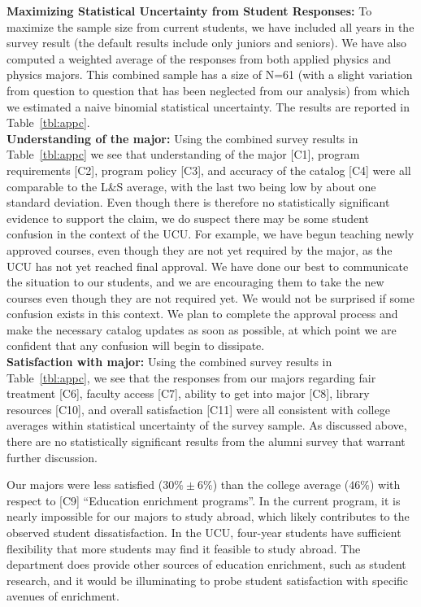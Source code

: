 \documentclass[12pt]{article}
\begin{document}
\noindent
{\bf Maximizing Statistical Uncertainty from Student Responses:} To
maximize the sample size from current students, we have included all
years in the survey result (the default results include only juniors
and seniors).  We have also computed a weighted average of the
responses from both applied physics and physics majors.  This combined
sample has a size of N=61 (with a slight variation from question to
question that has been neglected from our analysis) from which we
estimated a naive binomial statistical uncertainty.  The results are
reported in Table~\ref{tbl:appc}.\\[3pt]

\noindent
{\bf Understanding of the major:} Using the combined survey results in
Table~\ref{tbl:appc} we see that understanding of the major [C1],
program requirements [C2], program policy [C3], and accuracy of the
catalog [C4] were all comparable to the L\&S average, with the last
two being low by about one standard deviation.  Even though there is
therefore no statistically significant evidence to support the claim,
we do suspect there may be some student confusion in the context of
the UCU.  For example, we have begun teaching newly approved courses,
even though they are not yet required by the major, as the UCU has not
yet reached final approval.  We have done our best to communicate the
situation to our students, and we are encouraging them to take the new
courses even though they are not required yet.  We would not be
surprised if some confusion exists in this context.  We plan to
complete the approval process and make the necessary catalog updates
as soon as possible, at which point we are confident that any
confusion will begin to dissipate.\\[3pt]

\noindent
{\bf Satisfaction with major:} Using the combined survey results in
Table~\ref{tbl:appc}, we see that the responses from our majors
regarding fair treatment [C6], faculty access [C7], ability to get
into major [C8], library resources [C10], and overall satisfaction
[C11] were all consistent with college averages within statistical
uncertainty of the survey sample.  As discussed above, there are no
statistically significant results from the alumni survey that warrant
further discussion.

Our majors were less satisfied ($30\% \pm 6\%$) than the college
average ($46\%$) with respect to [C9] ``Education enrichment
programs''.  In the current program, it is nearly impossible for our
majors to study abroad, which likely contributes to the observed
student dissatisfaction.  In the UCU, four-year students have
sufficient flexibility that more students may find it feasible to
study abroad.  The department does provide other sources of education
enrichment, such as student research, and it would be illuminating to
probe student satisfaction with specific avenues of enrichment.
\end{document}
